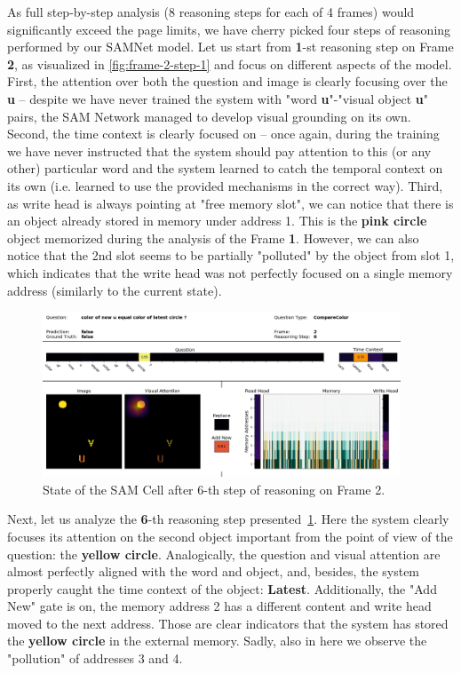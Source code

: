 As full step-by-step analysis (8 reasoning steps for each of 4 frames) would significantly exceed the page limits, we have cherry picked four steps of reasoning performed by our SAMNet model.
Let us start from \textbf{1}-st reasoning step on Frame \textbf{2}, as visualized in \cref{fig:frame-2-step-1} and focus on different aspects of the model.
First, the attention over both the question and image is clearly focusing over the \textbf{u} -- despite we have never trained the system with "word \textbf{u}"-"visual object \textbf{u}" pairs, the SAM Network managed to develop visual grounding on its own.
Second, the time context is clearly focused on  -- once again, during the training we have never instructed that the system should pay attention to this (or any other) particular word and the system learned to catch the temporal context on its own (i.e. learned to use the provided mechanisms in the correct way).
Third, as write head is always pointing at "free memory slot", we can notice that there is an object already stored in memory under address 1.
This is the \textbf{pink circle} object memorized during the analysis of the Frame \textbf{1}.
However, we can also notice that the 2nd slot seems to be partially "polluted" by the object from slot 1, which indicates that the write head was not perfectly focused on a single memory address (similarly to the current state).


\begin{figure}[!h]
\centering
  \includegraphics[width=0.95\textwidth]{"../img/visualization/experiment_run_20190917_022319/Frame 2 Step 6"}
\caption{State of the SAM Cell after 6-th step of reasoning on Frame 2.} 
\label{fig:frame-2-step-6}
\end{figure}

Next, let us analyze the \textbf{6}-th reasoning step presented~\cref{fig:frame-2-step-6}.
Here the system clearly focuses its attention on the second object important from the point of view of the question: the \textbf{yellow circle}.
Analogically, the question and visual attention are almost perfectly aligned with the word and object, and, besides, the system  properly caught the time context of the object: \textbf{Latest}.
Additionally, the "Add New" gate is on, the memory address 2 has a different content and write head moved to the next address.
Those are clear indicators that the system has stored the \textbf{yellow circle} in the external memory.
Sadly, also  in here we observe the "pollution" of addresses 3 and 4.


